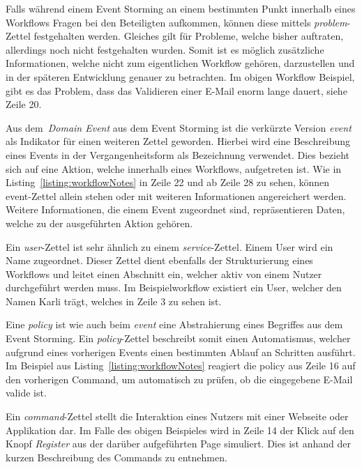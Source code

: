 
Falls während einem Event Storming an einem bestimmten Punkt innerhalb eines Workflows Fragen bei den Beteiligten aufkommen,
können diese mittels \textit{problem}-Zettel festgehalten werden.
Gleiches gilt für Probleme, welche bisher auftraten, allerdings noch nicht festgehalten wurden.
Somit ist es möglich zusätzliche Informationen, welche nicht zum eigentlichen Workflow gehören, darzustellen und in der
späteren Entwicklung genauer zu betrachten.
Im obigen Workflow Beispiel, gibt es das Problem, dass das Validieren einer E-Mail enorm lange dauert, siehe Zeile 20.


Aus dem~\textit{Domain Event} aus dem Event Storming ist die verkürzte Version \textit{event} als Indikator für einen weiteren Zettel geworden.
Hierbei wird eine Beschreibung eines Events in der Vergangenheitsform als Bezeichnung verwendet.
Dies bezieht sich auf eine Aktion, welche innerhalb eines Workflows, aufgetreten ist.
Wie in Listing~\ref{listing:workflowNotes} in Zeile 22 und ab Zeile 28 zu sehen, können event-Zettel allein stehen oder mit weiteren Informationen
angereichert werden.
Weitere Informationen, die einem Event zugeordnet sind, repräsentieren Daten, welche zu der ausgeführten Aktion gehören.


Ein \textit{user}-Zettel ist sehr ähnlich zu einem \textit{service}-Zettel.
Einem User wird ein Name zugeordnet.
Dieser Zettel dient ebenfalls der Strukturierung eines Workflows und leitet einen Abschnitt ein, welcher aktiv von einem
Nutzer durchgeführt werden muss.
Im Beispielworkflow existiert ein User, welcher den Namen Karli trägt, welches in Zeile 3 zu sehen ist.

Eine \textit{policy} ist wie auch beim \textit{event} eine Abstrahierung eines Begriffes aus dem Event Storming.
Ein \textit{policy}-Zettel beschreibt somit einen Automatismus, welcher aufgrund eines vorherigen Events einen bestimmten
Ablauf an Schritten ausführt.
Im Beispiel aus Listing~\ref{listing:workflowNotes} reagiert die policy aus Zeile 16 auf den vorherigen Command, um automatisch zu prüfen,
ob die eingegebene E-Mail valide ist.


Ein \textit{command}-Zettel stellt die Interaktion eines Nutzers mit einer Webseite oder Applikation dar.
Im Falle des obigen Beispieles wird in Zeile 14 der Klick auf den Knopf \textit{Register} aus der darüber aufgeführten Page simuliert.
Dies ist anhand der kurzen Beschreibung des Commands zu entnehmen.

